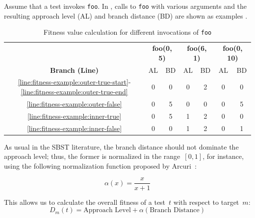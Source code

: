 \documentclass[paper=a4,%
  twoside,%
  BCOR4mm,%
  abstract=true,%
  toc=bibliography,%
  chapterprefix=true,%
  toc=bibliographynumbered,%
  open=right,%
  english,%
  pagesize=pdftex]{scrreprt}
\begin{document}
Assume that a test invokes \texttt{foo}. In , calls to \texttt{foo} with various arguments and the resulting approach level (AL) and branch distance (BD) are shown as examples .
\begin{table}[h!]
\centering
\begin{tabular}{c|cc|cc|cc}
\hline
& \multicolumn{2}{c|}{\textbf{foo(0, 5)}}                     & \multicolumn{2}{c|}{\textbf{foo(6, 1)}}                      & \multicolumn{2}{c}{\textbf{foo(0, 10)}}                     \\
\cline{2-7}
\textbf{Branch (Line)} & AL & BD & AL & BD & AL & BD \\
\hline
\ref{line:fitness-example:outer-true-start}-\ref{line:fitness-example:outer-true-end} & 0                       & 0                        & 0                       & 2                        & 0                       & 0                        \\
\ref{line:fitness-example:outer-false}                      & 0                       & 5                        & 0                       & 0                        & 0                       & 5                        \\
\ref{line:fitness-example:inner-true}                      & 0                       & 5                        & 1                       & 2                        & 0                       & 0                        \\
\ref{line:fitness-example:inner-false}                      & 0                       & 0                        & 1                       & 2                        & 0                       & 1 \\ \hline
\end{tabular}
\caption{Fitness value calculation for different invocations of \texttt{foo}}
\label{tab:example-fitness-calculation}
\end{table}

As usual in the \ac{SBST} literature, the branch distance should not dominate the approach level; thus, the former is normalized in the range~$[0, 1]$, for instance, using the following normalization function proposed by Arcuri~\cite{Arcuri_2011}:

\[\alpha(x) = \frac{x}{x + 1}\]

This allows us to calculate the overall fitness of a test~$t$ with respect to target~$m$:
\[D_m(t) = \text{Approach Level} + \alpha(\text{Branch Distance})\]
\end{document}
